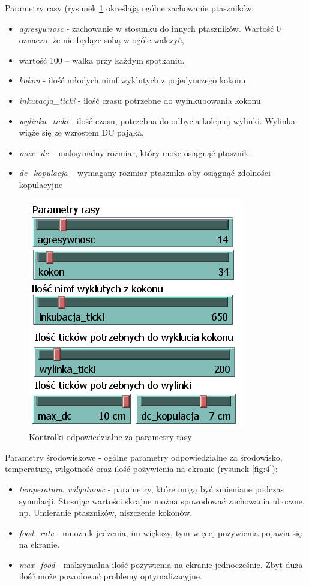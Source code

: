 \documentclass[a4paper,11pt,titlepage]{article}
\begin{document}
Parametry rasy (rysunek \ref{fig:5} określają ogólne zachowanie ptaszników:
\begin{itemize}
\item \textit{agresywnosc} - zachowanie w stosunku do innych ptaszników. Wartość 0 oznacza, że nie będąze sobą w ogóle walczyć, \item wartość 100 – walka przy każdym spotkaniu. 
\item \textit{kokon} - ilość młodych nimf wyklutych z pojedynczego kokonu 
\item \textit{inkubacja\_ticki} - ilość czasu potrzebne do wyinkubowania kokonu
\item \textit{wylinka\_ticki} - ilość czasu, potrzebna do odbycia kolejnej wylinki. Wylinka wiąże się ze wzrostem DC pająka. 
\item \textit{max\_dc} – maksymalny rozmiar, który może osiągnąć ptasznik. 
\item \textit{dc\_kopulacja} – wymagany rozmiar ptasznika aby osiągnąć zdolności kopulacyjne 
\end{itemize}

\begin{figure}[H]
\centering
\includegraphics[width=.5\columnwidth]{img/parametry_rasy.PNG}
\caption{Kontrolki odpowiedzialne za parametry rasy}
\label{fig:5}
\end{figure}


Parametry środowiskowe - ogólne parametry odpowiedzialne za środowisko, temperaturę, wilgotność oraz ilość pożywienia na ekranie (rysunek \ref{fig:4}):
\begin{itemize}
\item \textit{temperatura}, \textit{wilgotnosc} - parametry, które mogą być zmieniane podczas symulacji. Stosując wartości skrajne można spowodować zachowania uboczne, np. Umieranie ptaszników, niszczenie kokonów.
\item \textit{food\_rate} - mnożnik jedzenia, im większy, tym więcej pożywienia pojawia się na ekranie.
\item \textit{max\_food} - maksymalna ilość pożywienia na ekranie jednocześnie. Zbyt duża ilość może powodować problemy optymalizacyjne. 
\end{itemize}
\end{document}
